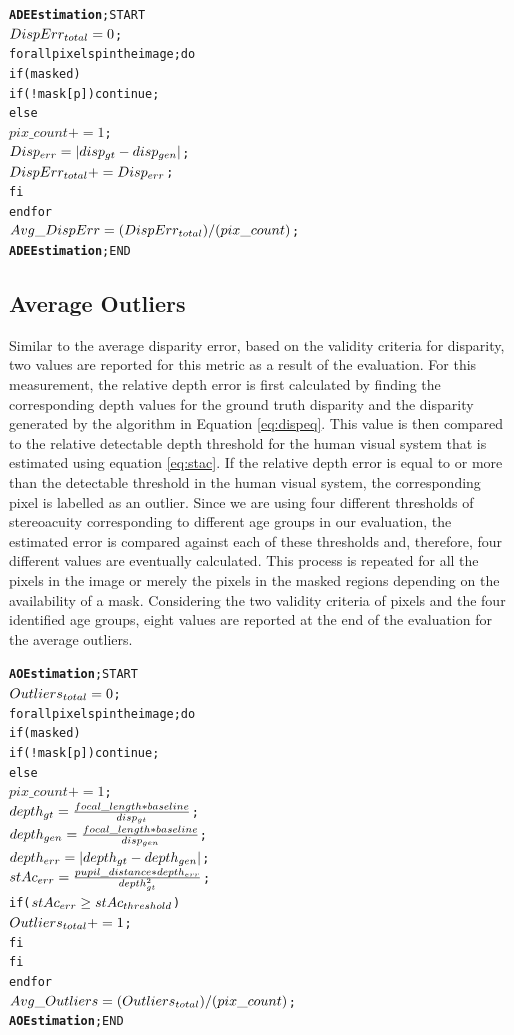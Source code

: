 \begin{alltt}
\textbf{ADE Estimation}; START
   \(DispErr\sb{total}=0\);
   for all pixels p in the image; do
      if (masked)
         if(!mask[p]) continue;
      else 
         \(pix\_count += 1\);
         \(Disp\sb{err} = |disp\sb{gt}-disp\sb{gen}|\);
         \(DispErr\sb{total} += Disp\sb{err}\);
      fi
  end for
   \(Avg\_DispErr = (DispErr\sb{total})/(pix\_count)\);
\textbf{ADE Estimation}; END
\end{alltt}

\subsection{Average Outliers}
Similar to the average disparity error, based on the validity criteria for disparity, 
two values are reported for this metric as a result of the evaluation. For this measurement, the relative depth error is first calculated by finding the corresponding depth values
for the ground truth disparity and the disparity generated by the algorithm in Equation \ref{eq:dispeq}. This value is then compared to the relative 
detectable depth threshold for the human visual system that is estimated using
equation \ref{eq:stac}. If the relative depth error is equal to or more than the detectable threshold in the human visual system,
the corresponding pixel is labelled as an outlier. Since we are using four different thresholds of stereoacuity corresponding to different
age groups in our evaluation, the estimated error is compared against each of these thresholds and, therefore,
four different values are eventually calculated. This process is repeated for all the pixels in the image or 
merely the pixels in the masked regions depending on the availability of a mask.
Considering the two validity criteria of pixels and the four identified age groups, 
eight values are reported at the end of the evaluation for the average outliers.

\begin{alltt}
\textbf{AO Estimation}; START
   \(Outliers\sb{total} = 0\);
   for all pixels p in the image; do
         if (masked)
            if(!mask[p]) continue;
         else 
            \(pix\_count += 1\);
            \(depth\sb{gt} = \frac{focal\_length * baseline}{disp\sb{gt}}\);
            \(depth\sb{gen} = \frac{focal\_length * baseline}{disp\sb{gen}}\);
            \(depth\sb{err} = |depth\sb{gt}-depth\sb{gen}|\);
            \(stAc\sb{err} = \frac{pupil\_distance*depth\sb{err}}{depth\sb{gt}\sp{2}}\);
            if (\(stAc\sb{err} \geq stAc\sb{threshold}\))
               \(Outliers\sb{total} += 1\);
            fi
        fi
   end for
   \(Avg\_Outliers = (Outliers\sb{total})/(pix\_count)\);
\textbf{AO Estimation}; END
\end{alltt}

